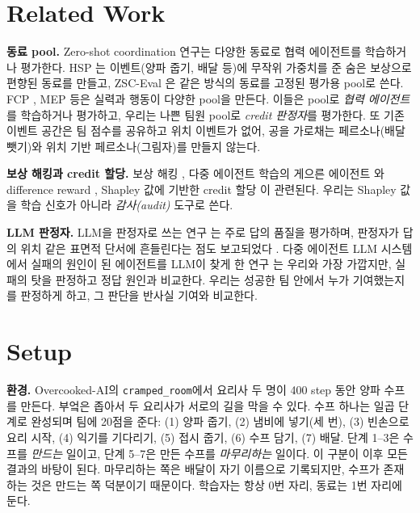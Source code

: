 \documentclass[letterpaper]{article} %
\begin{document}
\section{Related Work}
\textbf{동료 pool.} Zero-shot coordination 연구는 다양한 동료로 협력 에이전트를 학습하거나 평가한다.
HSP \cite{yu2023hsp}는 이벤트(양파 줍기, 배달 등)에 무작위 가중치를 준 숨은 보상으로 편향된 동료를 만들고,
ZSC-Eval \cite{wang2024zsceval}은 같은 방식의 동료를 고정된 평가용 pool로 쓴다. FCP \cite{strouse2021fcp},
MEP \cite{zhao2023mep} 등은 실력과 행동이 다양한 pool을 만든다. 이들은 pool로 \emph{협력 에이전트}를 학습하거나
평가하고, 우리는 나쁜 팀원 pool로 \emph{credit 판정자}를 평가한다. 또 기존 이벤트 공간은 팀 점수를 공유하고
위치 이벤트가 없어, 공을 가로채는 페르소나(배달 뺏기)와 위치 기반 페르소나(그림자)를 만들지 않는다.

\textbf{보상 해킹과 credit 할당.} 보상 해킹 \cite{pan2022effects,skalse2022defining}, 다중 에이전트 학습의
게으른 에이전트 \cite{sunehag2018vdn}와 difference reward \cite{foerster2018coma}, Shapley 값에 기반한 credit
할당 \cite{wang2020shapleyq,li2021shapley}이 관련된다. 우리는 Shapley 값을 학습 신호가 아니라
\emph{감사(audit)} 도구로 쓴다.

\textbf{LLM 판정자.} LLM을 판정자로 쓰는 연구 \cite{zheng2023judging}는 주로 답의 품질을 평가하며, 판정자가
답의 위치 같은 표면적 단서에 흔들린다는 점도 보고되었다 \cite{wang2024fair}. 다중 에이전트 LLM 시스템에서
실패의 원인이 된 에이전트를 LLM이 찾게 한 연구 \cite{zhang2025which}는 우리와 가장 가깝지만, 실패의 탓을
판정하고 정답 원인과 비교한다. 우리는 성공한 팀 안에서 누가 기여했는지를 판정하게 하고, 그 판단을 반사실
기여와 비교한다.

\section{Setup}
\textbf{환경.} Overcooked-AI의 \texttt{cramped\_room}에서 요리사 두 명이 400 step
동안 양파 수프를 만든다. 부엌은 좁아서 두 요리사가 서로의 길을 막을 수 있다. 수프 하나는 일곱 단계로
완성되며 팀에 20점을 준다: (1) 양파 줍기, (2) 냄비에 넣기(세 번), (3) 빈손으로 요리 시작, (4) 익기를
기다리기, (5) 접시 줍기, (6) 수프 담기, (7) 배달. 단계 1--3은 수프를 \emph{만드는} 일이고, 단계 5--7은 만든
수프를 \emph{마무리하는} 일이다. 이 구분이 이후 모든 결과의 바탕이 된다. 마무리하는 쪽은 배달이 자기 이름으로
기록되지만, 수프가 존재하는 것은 만드는 쪽 덕분이기 때문이다. 학습자는 항상 0번 자리, 동료는 1번 자리에 둔다.
\end{document}
